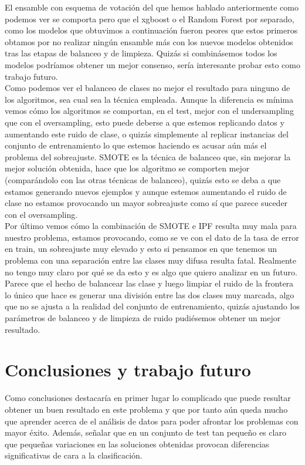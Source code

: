 \documentclass[10pt,a4paper]{article}
\begin{document}
El ensamble con esquema de votación del que hemos hablado anteriormente como podemos ver se comporta pero que el xgboost o el Random Forest por separado, como los modelos que obtuvimos a continuación fueron peores que estos primeros obtamos por no realizar ningún ensamble más con los nuevos modelos obtenidos tras las etapas de balanceo y de limpieza. Quizás si combinásemos todos los modelos podríamos obtener un mejor consenso, sería interesante probar esto como trabajo futuro.\\

Como podemos ver el balanceo de clases no mejor el resultado para ninguno de los algoritmos, sea cual sea la técnica empleada. Aunque la diferencia es mínima vemos cómo los algoritmos se comportan, en el test, mejor con el undersampling que con el oversampling, esto puede deberse a que estemos replicando datos y aumentando este ruido de clase, o quizás simplemente al replicar instancias del conjunto de entrenamiento lo que estemos haciendo es acusar aún más el problema del sobreajuste. SMOTE es la técnica de balanceo que, sin mejorar la mejor solución obtenida, hace que los algoritmo se comporten mejor (comparándolo con las otras técnicas de balanceo), quizás esto se deba a que estamos generando nuevos ejemplos y aunque estemos aumentando el ruido de clase no estamos provocando un mayor sobreajuste como sí que parece suceder con el oversampling.\\

Por último vemos cómo la combinación de SMOTE e IPF resulta muy mala para nuestro problema, estamos provocando, como se ve con el dato de la tasa de error en train, un sobreajuste muy elevado y esto si pensamos en que tenemos un problema con una separación entre las clases muy difusa resulta fatal. Realmente no tengo muy claro por qué se da esto y es algo que quiero analizar en un futuro. Parece que el hecho de balancear las clase y luego limpiar el ruido de la frontera lo único que hace es generar una división entre las dos clases muy marcada, algo que no se ajusta a la realidad del conjunto de entrenamiento, quizás ajustando los parámetros de balanceo y de limpieza de ruido pudiésemos obtener un mejor resultado.

\section{Conclusiones y trabajo futuro}

Como conclusiones destacaría en primer lugar lo complicado que puede resultar obtener un buen resultado en este problema y que por tanto aún queda mucho que aprender acerca de el análisis de datos para poder afrontar los problemas con mayor éxito. Además, señalar que en un conjunto de test tan pequeño es claro que pequeñas variaciones en las soluciones obtenidas provocan diferencias significativas de cara a la clasificación.\\
\end{document}
